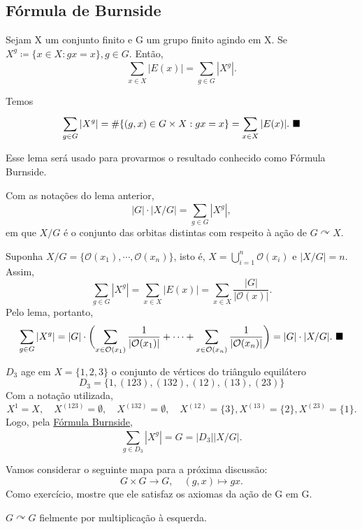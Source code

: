 \documentclass[algebra_notes.tex]{subfiles}
\begin{document}
\subsection{Fórmula de Burnside}
\begin{lemma*}
	Sejam X um conjunto finito e G um grupo finito agindo em X. Se \(X^{g}\coloneqq \{x\in X: gx=x\}, g\in G\).
	Então,
	\[
		\sum\limits_{x\in X}^{}|E(x)| = \sum\limits_{g\in G}^{}|X^{g}|.
	\]
\end{lemma*}
\begin{proof*}
	Temos
	\[
		\sum\limits_{g\in G}^{}|X^{g}| = \#\{(g, x)\in G\times X: gx=x\} = \sum\limits_{x\in X}^{}|E(x)|.\text{ $\blacksquare$}
	\]
\end{proof*}
Esse lema será usado para provarmos o resultado conhecido como Fórmula Burnside.
\hypertarget{burnside}{
	\begin{prop*}
		Com as notações do lema anterior,
		\[
			|G|\cdot |X/G| = \sum\limits_{g\in G}^{}|X^{g}|,
		\]
		em que \(X/G\) é o conjunto das orbitas distintas com respeito à ação de \(G \curvearrowright X\).
	\end{prop*}
}
\begin{proof*}
	Suponha \(X/G=\{\mathcal{O}(x_{1}), \cdots, \mathcal{O}(x_{n})\}\), isto é, \(X=\bigcup_{i=1}^{n}{\mathcal{O}(x_{i})}\)
	e \(|X/G| = n\). Assim,
	\[
		\sum\limits_{g\in G}^{}|X^{g}| = \sum\limits_{x\in X}^{}|E(x)| = \sum\limits_{x\in X}^{}\frac{|G|}{|\mathcal{O}(x)|}.
	\]
	Pelo lema, portanto,
	\[
		\sum\limits_{g\in G}^{}|X^{g}| = |G|\cdot \biggl(\sum\limits_{x\in \mathcal{O}(x_{1})}^{}\frac{1}{|\mathcal{O}(x_{1})|} + \cdots + \sum\limits_{x\in \mathcal{O}(x_{n})}^{}\frac{1}{|\mathcal{O}(x_{n})|}\biggr) = |G|\cdot |X/G|.\text{ $\blacksquare$}
	\]
\end{proof*}
\begin{example*}
	\(D_{3}\) age em \(X=\{1, 2, 3\}\) o conjunto de vértices do triângulo equilátero
	\[
		D_{3} = \{1, (123), (132), (12), (13), (23)\}
	\]
	Com a notação utilizada,
	\[
		X^{1} = X,\quad X^{(123)}=\emptyset,\quad X^{(132)}=\emptyset,\quad X^{(12)}=\{3\}, X^{(13)}=\{2\}, X^{(23)}=\{1\}.
	\]
	Logo, pela \hyperlink{burnside}{Fórmula Burnside},
	\[
		\sum\limits_{g\in D_{3}}^{}|X^{g}| = G = |D_{3}||X/G|.
	\]
\end{example*}
Vamos considerar o seguinte mapa para a próxima discussão:
\[
	G\times{G}\rightarrow G,\quad (g, x)\mapsto gx.
\]
Como exercício, mostre que ele satisfaz os axiomas da ação de G em G.
\begin{lemma*}
	\(G \curvearrowright G\) fielmente por multiplicação à esquerda.
\end{lemma*}
\end{document}
